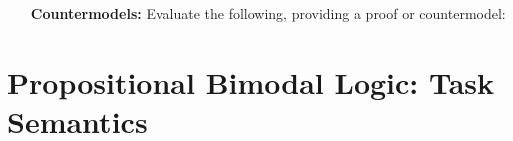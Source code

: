 \documentclass[a4paper, 11pt]{article} %
\begin{document}
\begin{enumerate}[leftmargin=1.2in]
  \item[\bf Countermodels:] Evaluate the following, providing a proof or countermodel:
    \begin{enumerate}[label=\arabic*.,resume]\small
    \end{enumerate}
\end{enumerate}






\section*{\sc Propositional Bimodal Logic: Task Semantics}
  
\end{document}
